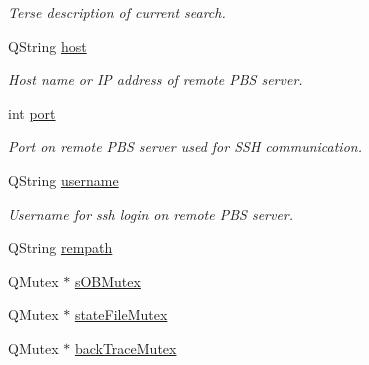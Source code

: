\begin{DoxyCompactItemize}
\begin{DoxyCompactList}\small\item\em Terse description of current search. \end{DoxyCompactList}\item 
\hypertarget{classGlobalSearch_1_1OptBase_a450b588c2994270e8e053365f094fb52}{}Q\+String \hyperlink{classGlobalSearch_1_1OptBase_a450b588c2994270e8e053365f094fb52}{host}\label{classGlobalSearch_1_1OptBase_a450b588c2994270e8e053365f094fb52}

\begin{DoxyCompactList}\small\item\em Host name or I\+P address of remote P\+B\+S server. \end{DoxyCompactList}\item 
\hypertarget{classGlobalSearch_1_1OptBase_aa07a4fe47df0f8d4fface200fdde4dee}{}int \hyperlink{classGlobalSearch_1_1OptBase_aa07a4fe47df0f8d4fface200fdde4dee}{port}\label{classGlobalSearch_1_1OptBase_aa07a4fe47df0f8d4fface200fdde4dee}

\begin{DoxyCompactList}\small\item\em Port on remote P\+B\+S server used for S\+S\+H communication. \end{DoxyCompactList}\item 
\hypertarget{classGlobalSearch_1_1OptBase_a75c9102491957d00fd6bd4da9329c2ed}{}Q\+String \hyperlink{classGlobalSearch_1_1OptBase_a75c9102491957d00fd6bd4da9329c2ed}{username}\label{classGlobalSearch_1_1OptBase_a75c9102491957d00fd6bd4da9329c2ed}

\begin{DoxyCompactList}\small\item\em Username for ssh login on remote P\+B\+S server. \end{DoxyCompactList}\item 
Q\+String \hyperlink{classGlobalSearch_1_1OptBase_a777ad7fbedbb76f522e02ca73883ab7d}{rempath}
\item 
Q\+Mutex $\ast$ \hyperlink{classGlobalSearch_1_1OptBase_a86c1868458b6f8430dc366c009c9deb5}{s\+O\+B\+Mutex}
\item 
Q\+Mutex $\ast$ \hyperlink{classGlobalSearch_1_1OptBase_af0df28a179c8a89022f4887c18761956}{state\+File\+Mutex}
\item 
\hypertarget{classGlobalSearch_1_1OptBase_aa74d5687ec2969388db9c4a87adbfce5}{}Q\+Mutex $\ast$ \hyperlink{classGlobalSearch_1_1OptBase_aa74d5687ec2969388db9c4a87adbfce5}{back\+Trace\+Mutex}\label{classGlobalSearch_1_1OptBase_aa74d5687ec2969388db9c4a87adbfce5}


\end{DoxyCompactItemize}
